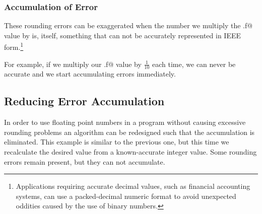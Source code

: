 \subsubsection{Accumulation of Error}
These  rounding errors can be exaggerated when the number we multiply 
the \verb@x.f@ value by is, itself, something that can not be accurately 
represented in IEEE 
form.\footnote{Applications requiring accurate decimal values, such as 
financial accounting systems, can use a packed-decimal numeric format
to avoid unexpected oddities caused by the use of binary numbers.}

For example, if we multiply our \verb@x.f@ value by $\frac{1}{10}$ each time, 
we can never be accurate and we start accumulating errors immediately.


\subsection{Reducing Error Accumulation} 
In order to use floating point numbers in a program without causing 
excessive rounding problems an algorithm can be redesigned such that the 
accumulation is eliminated.  
This example is similar to the previous one, but this time we recalculate the 
desired value from a known-accurate integer value.  
Some rounding errors remain present, but they can not accumulate.

